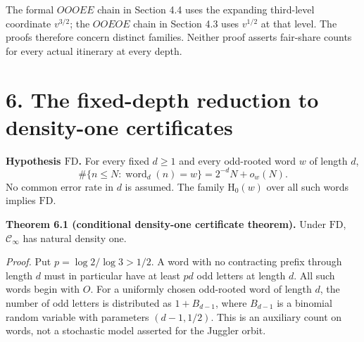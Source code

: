 \documentclass[11pt,a4paper]{article}
\begin{document}
\endgroup

The formal \(OOOEE\) chain in Section 4.4 uses the expanding third-level
coordinate \(v^{3/2}\); the \(OOEOE\) chain in Section 4.3 uses
\(v^{1/2}\) at that level. The proofs therefore concern distinct
families. Neither proof asserts fair-share counts for every actual
itinerary at every depth.

\section{6. The fixed-depth reduction to density-one
certificates}\label{the-fixed-depth-reduction-to-density-one-certificates}


\textbf{Hypothesis \(\mathrm{FD}\).} For every fixed \(d\ge1\) and every
odd-rooted word \(w\) of length \(d\), \[
\#\{n\le N:\operatorname{word}_d(n)=w\}=2^{-d}N+o_w(N).
\] No common error rate in \(d\) is assumed. The family
\(\mathrm H_0(w)\) over all such words implies \(\mathrm{FD}\).


\textbf{Theorem 6.1 (conditional density-one certificate theorem).}
Under \(\mathrm{FD}\), \(\mathcal C_\infty\) has natural density one.

\emph{Proof.} Put \(p=\log2/\log3>1/2\). A word with no contracting
prefix through length \(d\) must in particular have at least \(pd\) odd
letters at length \(d\). All such words begin with \(O\). For a
uniformly chosen odd-rooted word of length \(d\), the number of odd
letters is distributed as \(1+B_{d-1}\), where \(B_{d-1}\) is a binomial
random variable with parameters \((d-1,1/2)\). This is an auxiliary
count on words, not a stochastic model asserted for the Juggler orbit.
\end{document}
